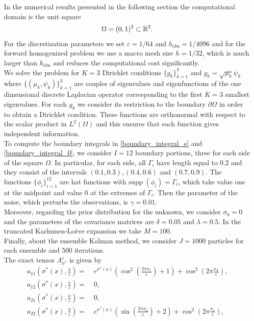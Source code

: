 \documentclass[10pt]{article}
\begin{document}
In the numerical results presented in the following section the computational domain is the unit square
\[ \Omega = (0,1)^2 \subset \mathbb{R}^2. \]
For the discretization parameters we set $\varepsilon = 1/64$ and $h_{\mathrm{obs}} = 1/4096$ and for the forward homogenized problem we use a macro mesh size $h = 1/32$, which is much larger than $h_{\mathrm{obs}}$ and reduces the computational cost significantly. \\
We solve the problem for $K = 3$ Dirichlet conditions $\{ g_k \}_{k=1}^3$ and $g_k = \sqrt{\mu_k} \psi_k$ where $\{ (\mu_k, \psi_k) \}_{k=1}^3$ are couples of eigenvalues and eigenfunctions of the one dimensional discrete Laplacian operator corresponding to the first $K = 3$ smallest eigenvalues. For each $g_k$ we consider its restriction to the boundary $\partial \Omega$ in order to obtain a Dirichlet condition. These functions are orthonormal with respect to the scalar product in $L^2(\Omega)$ and this ensures that each function gives independent information. \\
To compute the boundary integrals in \eqref{boundary_integral_e} and \eqref{boundary_integral_0}, we consider $I = 12$ boundary portions, three for each side of the square $\Omega$. In particular, for each side, all $\Gamma_i$ have length equal to $0.2$ and they consist of the intervals $(0.1,0.3), (0.4,0.6)$ and $(0.7,0.9)$. The functions $\{ \phi_i \}_{i=1}^{12}$ are hat functions with $\mathrm{supp} \; (\phi_i) = \Gamma_i$, which take value one at the midpoint and value $0$ at the extremes of $\Gamma_i$. Then the parameter of the noise, which perturbs the observations, is $\gamma = 0.01$. \\
Moreover, regarding the prior distribution for the unknown, we consider $\sigma_0 = 0$ and the parameters of the covariance matrices are $\delta = 0.05$ and $\lambda = 0.5$. In the truncated Karhunen-Lo\`eve expansion we take $M = 100$. \\
Finally, about the ensemble Kalman method, we consider $J = 1000$ particles for each ensemble and $500$ iterations. \\
The exact tensor $A_{\sigma^*}^{\varepsilon}$ is given by
\begin{align*}
a_{11} \left ( \sigma^*(x), \frac{x}{\varepsilon} \right ) = & \; e^{\sigma^*(x)} \left ( \cos^2 \left ( \frac{2 \pi x_1}{\varepsilon} \right ) + 1 \right ) + \cos^2 \left ( 2 \pi \frac{x_2}{\varepsilon} \right ), \\
a_{12} \left ( \sigma^*(x), \frac{x}{\varepsilon} \right ) = & \; 0, \\
a_{21} \left ( \sigma^*(x), \frac{x}{\varepsilon} \right ) = & \; 0, \\
a_{22} \left ( \sigma^*(x), \frac{x}{\varepsilon} \right ) = & \; e^{\sigma^*(x)} \left ( \sin \left ( \frac{2 \pi x_2}{\varepsilon} \right ) + 2 \right ) + \cos^2 \left ( 2 \pi \frac{x_1}{\varepsilon} \right ),
\end{align*}
\end{document}
